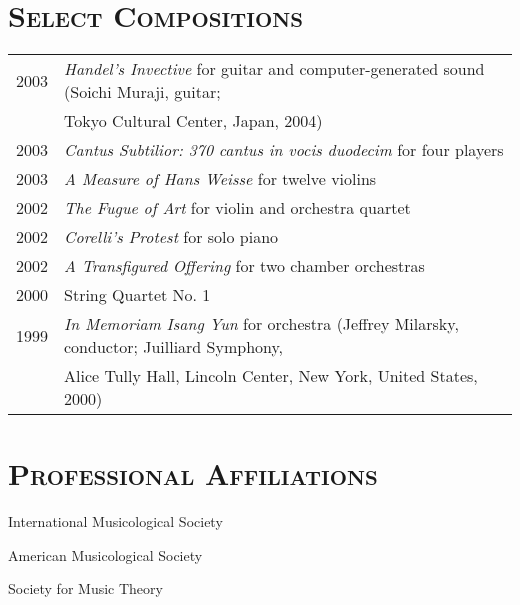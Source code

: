\documentclass[a4paper,11pt,draft]{article}
\begin{document}
  \vspace{2.5mm}
  
  \section*{\textsc{Select Compositions}}
  
  \hspace*{-0.25cm}
  \begin{tabular}{p{2.5cm} p{12.5cm}}
    2003 & \textit{Handel’s Invective} for guitar and computer-generated sound
    (Soichi Muraji, guitar;\\
    & Tokyo Cultural Center, Japan, 2004)\\[2mm]
    
    2003 & \textit{Cantus Subtilior: 370 cantus in vocis duodecim} for four
    players\\[2mm]
    
    2003 & \textit{A Measure of Hans Weisse} for twelve violins\\[2mm]
    
    2002 & \textit{The Fugue of Art} for violin and orchestra quartet\\[2mm]
    
    2002 & \textit{Corelli’s Protest} for solo piano\\[2mm]
    
    2002 & \textit{A Transfigured Offering} for two chamber orchestras\\[2mm]
    
    2000 & String Quartet No. 1\\[2mm]
    
    1999 & \textit{In Memoriam Isang Yun} for orchestra (Jeffrey Milarsky,
    conductor; Juilliard Symphony,\\
    & Alice Tully Hall, Lincoln Center, New York, United States, 2000)
  \end{tabular}
  
  \vspace{2.5mm}
  
  \section*{\textsc{Professional Affiliations}}
  
  International Musicological Society
  
  \noindent American Musicological Society
  
  \noindent Society for Music Theory
  
\end{document}
